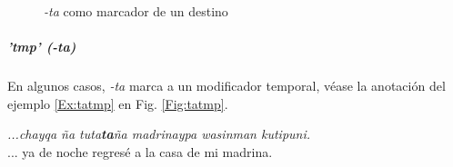 \documentclass[a4paper,11pt,DIV12]{scrartcl}
\begin{document}
\begin{figure}
 \begin{center}
\end{center}
\caption{{\em -ta} como marcador de un destino}\label{Fig:tagoal}
\end{figure}

\subparagraph{'tmp' ({\em -ta})}
En algunos casos, {\em -ta} marca a un modificador temporal, v\'ease la anotaci\'on del ejemplo \ref{Ex:tatmp} en Fig. \ref{Fig:tatmp}.

\begin{examples}
 \item\label{Ex:tatmp} {\em  ...chayqa ña tuta\textbf{ta}ña madrinaypa wasinman kutipuni.}\\
	... ya de noche regresé a la casa de mi madrina.\\
	    	 \hfill{\small \citep{Valderrama77}}
\end{examples}
\end{document}
